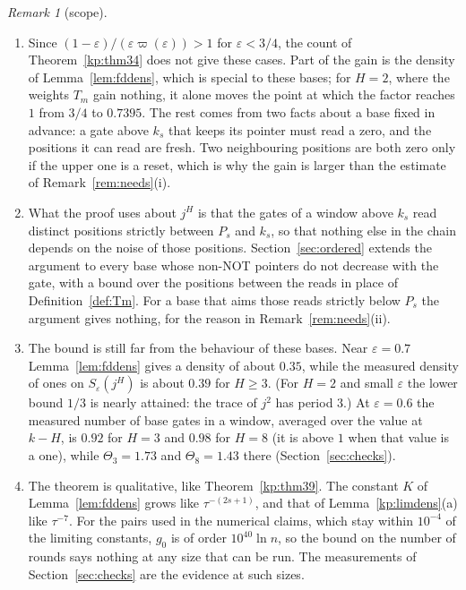 \documentclass[11pt]{amsart}
\theoremstyle{definition}
\theoremstyle{remark}
\newtheorem{remark}[theorem]{Remark}
\newcommand{\eps}{\varepsilon}
\begin{document}
\begin{remark}[scope]\label{rem:fixedscope}
\begin{enumerate}[label=(\roman*),leftmargin=2.4em]
\item Since $(1-\eps)/(\eps\varpi(\eps))>1$ for $\eps<3/4$, the count of Theorem~\ref{kp:thm34} does not give these
cases. Part of the gain is the density of Lemma~\ref{lem:fddens}, which is special to these
bases; for $H=2$, where the weights $T_m$ gain nothing, it alone moves the point at which the
factor reaches $1$ from $3/4$ to $0.7395$. The rest comes
from two facts about a base fixed in advance: a gate above $k_s$ that keeps
its pointer must read a zero, and the positions it can read are fresh. Two neighbouring positions
are both zero only if the upper one is a reset, which is why the gain is larger than the estimate
of Remark~\ref{rem:needs}(i).
\item What the proof uses about $j^H$ is that the gates of a window above $k_s$ read distinct
positions strictly between $P_s$ and $k_s$, so that nothing else in the chain depends on the
noise of those positions. Section~\ref{sec:ordered} extends the argument to every base whose non-NOT pointers do not
decrease with the gate, with a bound over the positions between the reads in place of
Definition~\ref{def:Tm}. For a base that aims those reads strictly
below $P_s$ the argument gives nothing, for the reason in Remark~\ref{rem:needs}(ii).
\item The bound is still far from the behaviour of these bases. Near $\eps=0.7$
Lemma~\ref{lem:fddens} gives a density of about $0.35$, while the measured density of ones on
$S_\eps(j^H)$ is about $0.39$ for $H\ge3$. (For $H=2$ and small $\eps$ the lower bound $1/3$ is
nearly attained: the trace of $j^2$ has period $3$.) At $\eps=0.6$ the measured number of base
gates in a window, averaged over the value at $k-H$, is $0.92$ for $H=3$ and $0.98$ for $H=8$ (it
is above $1$ when that value is a one), while $\Theta_3=1.73$ and $\Theta_8=1.43$ there
(Section~\ref{sec:checks}).
\item The theorem is qualitative, like Theorem~\ref{kp:thm39}. The constant $K$ of
Lemma~\ref{lem:fddens} grows like $\tau^{-(2s+1)}$, and that of Lemma~\ref{kp:limdens}(a) like
$\tau^{-7}$. For the pairs used in the numerical claims, which stay within $10^{-4}$ of the
limiting constants, $g_0$ is of order $10^{40}\ln n$, so the bound on the number of rounds says
nothing at any size that can be run. The measurements of Section~\ref{sec:checks} are the
evidence at such sizes.
\end{enumerate}
\end{remark}
\end{document}
